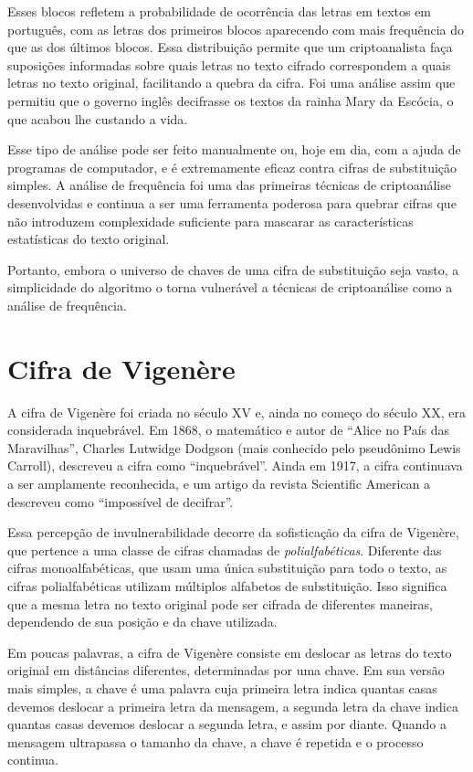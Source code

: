 Esses blocos refletem a probabilidade de ocorrência das letras em textos em português, com as letras dos primeiros blocos aparecendo com mais frequência do que as dos últimos blocos.
Essa distribuição permite que um criptoanalista faça suposições informadas sobre quais letras no texto cifrado correspondem a quais letras no texto original, facilitando a quebra da cifra.
Foi uma análise assim que permitiu que o governo inglês decifrasse os textos da rainha Mary da Escócia, o que acabou lhe custando a vida.

Esse tipo de análise pode ser feito manualmente ou, hoje em dia, com a ajuda de programas de computador, e é extremamente eficaz contra cifras de substituição simples.
A análise de frequência foi uma das primeiras técnicas de criptoanálise desenvolvidas e continua a ser uma ferramenta poderosa para quebrar cifras que não introduzem complexidade suficiente para mascarar as características estatísticas do texto original.

Portanto, embora o universo de chaves de uma cifra de substituição seja vasto, a simplicidade do algoritmo o torna vulnerável a técnicas de criptoanálise como a análise de frequência.

\section{Cifra de Vigenère}
\label{sec:cifra-de-vigenere}

A cifra de Vigenère foi criada no século XV e, ainda no começo do século XX, era considerada inquebrável.
Em 1868, o matemático e autor de ``Alice no País das Maravilhas'', Charles Lutwidge Dodgson (mais conhecido pelo pseudônimo Lewis Carroll), descreveu a cifra como ``inquebrável''.
Ainda em 1917, a cifra continuava a ser amplamente reconhecida, e um artigo da revista Scientific American a descreveu como ``impossível de decifrar''.

Essa percepção de invulnerabilidade decorre da sofisticação da cifra de Vigenère, que pertence a uma classe de cifras chamadas de {\em polialfabéticas}.
Diferente das cifras monoalfabéticas, que usam uma única substituição para todo o texto, as cifras polialfabéticas utilizam múltiplos alfabetos de substituição.
Isso significa que a mesma letra no texto original pode ser cifrada de diferentes maneiras, dependendo de sua posição e da chave utilizada.

Em poucas palavras, a cifra de Vigenère consiste em deslocar as letras do texto original em distâncias diferentes, determinadas por uma chave.
Em sua versão mais simples, a chave é uma palavra cuja primeira letra indica quantas casas devemos deslocar a primeira letra da mensagem, a segunda letra da chave indica quantas casas devemos deslocar a segunda letra, e assim por diante.
Quando a mensagem ultrapassa o tamanho da chave, a chave é repetida e o processo continua.


